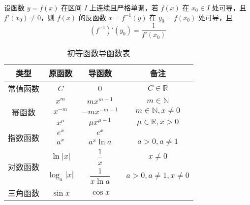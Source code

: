 \begin{theorem}
    设函数 $y = f(x)$ 在区间 $I$ 上连续且严格单调，若 $f(x)$ 在 $x_0\in I$ 处可导，且 $f'(x_0) \ne 0$，则 $f(x)$ 的反函数 $x = f^{-1}(y)$ 在 $y_0 = f(x_0)$ 处可导，且
    \[\left(f^{-1}\right)'(y_0) = \dfrac{1}{f'(x_0)}\]
\end{theorem}

\begin{table}
    \centering
    \caption{初等函数导函数表}
    \renewcommand\arraystretch{1.8}
    \begin{tabular}{|c|c|c|c|}
        \hline
        类型                        & 原函数                                              & 导函数                       & 备注                                           \\
        \hline
        常值函数                    & $C$                                                 & $0$                          & $C\in \mathbb{R}$                              \\
        \hline
        \multirow{3}{*}{幂函数}     & $x^m$                                               & $mx^{m - 1}$                 & $m \in \mathbb{N}$                             \\
                                    & $x^{-m}$                                            & $-mx^{-m - 1}$               & $m \in \mathbb{N},x \ne 0$                     \\
                                    & $x^\mu$                                             & $\mu x^{\mu - 1}$            & $\mu \in \mathbb{R}, x > 0$                    \\
        \hline
        \multirow{2}{*}{指数函数}   & $e^x$                                               & $e^x$                        &                                                \\
                                    & $a^x$                                               & $a^x\ln a$                   & $a > 0, a \ne 1$                               \\
        \hline
        \multirow{2}{*}{对数函数}   & $\ln |x|$                                           & $\dfrac{1}{x}$               & $x \ne 0$                                      \\[8pt]
                                    & $\log_a|x|$                                         & $\dfrac{1}{x\ln a}$          & $a > 0, a \ne 1, x \ne 0$                      \\[5pt]
        \hline
        \multirow{4}{*}{三角函数}   & $\sin x$                                            & $\cos x$                     &                                                \\

\end{tabular}
\end{table}
